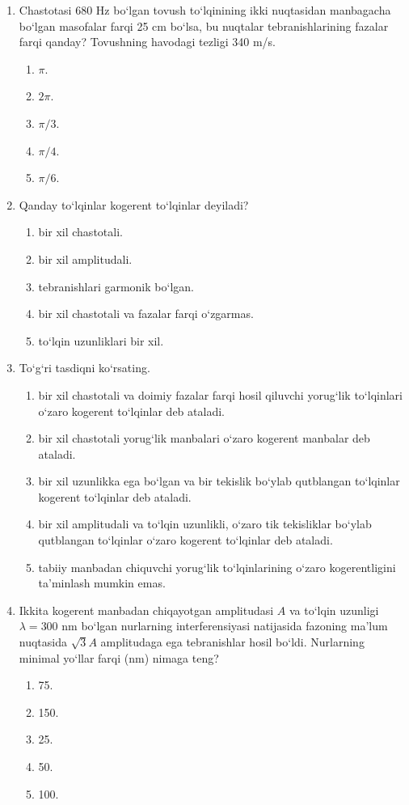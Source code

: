 \begin{enumerate}
\item Chastotasi 680 Hz bo‘lgan tovush to‘lqinining ikki nuqtasidan manbagacha bo‘lgan masofalar farqi 25 cm bo‘lsa, bu nuqtalar tebranishlarining fazalar farqi qanday? Tovushning havodagi tezligi 340 m/s.
\begin{enumerate}[label=\Alph*)]
\item $\pi$.
\item $2\pi$.
\item $\pi/3$.
\item $\pi/4$.
\item $\pi/6$.
\end{enumerate}

\item Qanday to‘lqinlar kogerent to‘lqinlar deyiladi?
\begin{enumerate}[label=\Alph*)]
\item bir xil chastotali.
\item bir xil amplitudali.
\item tebranishlari garmonik bo‘lgan.
\item bir xil chastotali va fazalar farqi o‘zgarmas.
\item to‘lqin uzunliklari bir xil.
\end{enumerate}

\item To‘g‘ri tasdiqni ko‘rsating.
\begin{enumerate}[label=\Alph*)]
\item bir xil chastotali va doimiy fazalar farqi hosil qiluvchi yorug‘lik to‘lqinlari o‘zaro kogerent to‘lqinlar deb ataladi.
\item bir xil chastotali yorug‘lik manbalari o‘zaro kogerent manbalar deb ataladi.
\item bir xil uzunlikka ega bo‘lgan va bir tekislik bo‘ylab qutblangan to‘lqinlar kogerent to‘lqinlar deb ataladi.
\item bir xil amplitudali va to‘lqin uzunlikli, o‘zaro tik tekisliklar bo‘ylab qutblangan to‘lqinlar o‘zaro kogerent to‘lqinlar deb ataladi.
\item tabiiy manbadan chiquvchi yorug‘lik to‘lqinlarining o‘zaro kogerentligini ta’minlash mumkin emas.
\end{enumerate}

\item Ikkita kogerent manbadan chiqayotgan amplitudasi $A$ va to‘lqin uzunligi $\lambda=300$ nm bo‘lgan nurlarning interferensiyasi natijasida fazoning ma’lum nuqtasida $\sqrt{3}A$ amplitudaga ega tebranishlar hosil bo‘ldi. Nurlarning minimal yo‘llar farqi (nm) nimaga teng?
\begin{enumerate}[label=\Alph*)]
\item 75.
\item 150.
\item 25.
\item 50.
\item 100.
\end{enumerate}


\end{enumerate}
